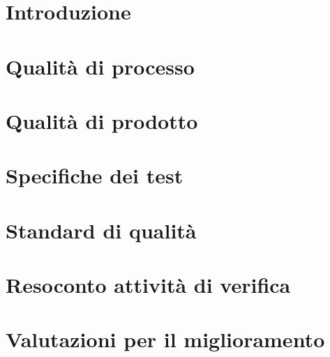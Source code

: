 \documentclass{article}
\begin{document}


\newpage
\section{Introduzione}%
\label{sec:introduzione}


\newpage
\section{Qualità di processo}%
\label{sec:qualita_di_processo}


\newpage
\section{Qualità di prodotto}%
\label{sec:qualita_di_prodotto}


\newpage
\section{Specifiche dei test}%
\label{sec:qualita_di_prodotto}


\newpage
\section{Standard di qualità}%
\label{sec:standard_di_qualita}


\newpage
\section{Resoconto attività di verifica}%
\label{sec:resoconto_attivita_di_verifica}


\newpage
\section{Valutazioni per il miglioramento}%
\label{sec:valutazioni_per_il_miglioramento}

\end{document}

